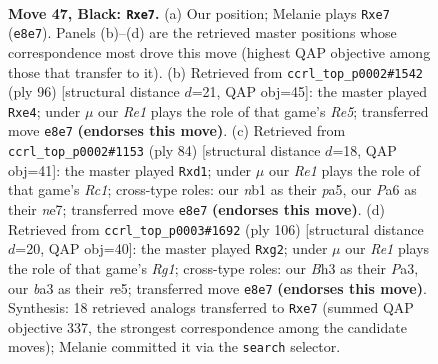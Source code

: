 \documentclass[11pt]{article}
\begin{document}
\clearpage

\begin{figure}[p]\centering
\begin{subfigure}{0.46\textwidth}\centering
\resizebox{\linewidth}{!}{%
\newchessgame
\chessboard[
  setfen={4r1k1/4R3/p1p5/8/8/B6b/5K2/1N6 b - - 6 47},
  showmover=false,
  pgfstyle=straightmove, color=movearrow, markmove={e8-e7}
]}
\caption{}
\end{subfigure}\hfill
\begin{subfigure}{0.46\textwidth}\centering
\resizebox{\linewidth}{!}{%
\newchessgame
\chessboard[
  setfen={8/7k/8/4R1K1/P3r3/8/6b1/8 w - - 0 49},
  showmover=false,
  pgfstyle=straightmove, color=movearrow, markmove={e5-e4}
]}
\caption{}
\end{subfigure}
\\[4pt]
\begin{subfigure}{0.46\textwidth}\centering
\resizebox{\linewidth}{!}{%
\newchessgame
\chessboard[
  setfen={6k1/4n3/8/p1N1B3/6b1/4K1P1/8/2Rr4 w - - 2 43},
  showmover=false,
  pgfstyle=straightmove, color=movearrow, markmove={c1-d1}
]}
\caption{}
\end{subfigure}\hfill
\begin{subfigure}{0.46\textwidth}\centering
\resizebox{\linewidth}{!}{%
\newchessgame
\chessboard[
  setfen={8/5k2/8/4r3/1P5p/P7/6r1/1K4R1 w - - 0 54},
  showmover=false,
  pgfstyle=straightmove, color=movearrow, markmove={g1-g2}
]}
\caption{}
\end{subfigure}
\caption{\textbf{Move 47, Black: \texttt{Rxe7}.} (a) Our position; Melanie plays \texttt{Rxe7} (\texttt{e8e7}). Panels (b)--(d) are the retrieved master positions whose correspondence most drove this move (highest QAP objective among those that transfer to it). (b) Retrieved from \texttt{ccrl\_top\_p0002\#1542} (ply 96) [structural distance $d$=21, QAP obj=45]: the master played \texttt{Rxe4}; under $\mu$ our \emph{Re1} plays the role of that game's \emph{Re5}; transferred move \texttt{e8e7} \textbf{(endorses this move)}. (c) Retrieved from \texttt{ccrl\_top\_p0002\#1153} (ply 84) [structural distance $d$=18, QAP obj=41]: the master played \texttt{Rxd1}; under $\mu$ our \emph{Re1} plays the role of that game's \emph{Rc1}; cross-type roles: our \emph{n}b1 as their \emph{p}a5, our \emph{P}a6 as their \emph{n}e7; transferred move \texttt{e8e7} \textbf{(endorses this move)}. (d) Retrieved from \texttt{ccrl\_top\_p0003\#1692} (ply 106) [structural distance $d$=20, QAP obj=40]: the master played \texttt{Rxg2}; under $\mu$ our \emph{Re1} plays the role of that game's \emph{Rg1}; cross-type roles: our \emph{B}h3 as their \emph{P}a3, our \emph{b}a3 as their \emph{r}e5; transferred move \texttt{e8e7} \textbf{(endorses this move)}. Synthesis: 18 retrieved analogs transferred to \texttt{Rxe7} (summed QAP objective 337, the strongest correspondence among the candidate moves); Melanie committed it via the \texttt{search} selector.}
\label{fig:thought-m93}
\end{figure}
\end{document}
